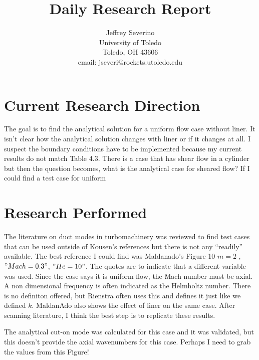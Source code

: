 \documentclass[a4paper]{article}
\begin{document}
\begin{titlepage}

    \title{
    Daily Research Report}

    \author{ Jeffrey Severino \\
        University of Toledo \\
        Toledo, OH  43606 \\
    email: jseveri@rockets.utoledo.edu}


    \maketitle

\end{titlepage}
\section{Current Research Direction}
The goal is to find the analytical solution for a uniform flow case without
liner. It isn't clear how the analytical solution changes with liner or if
it changes at all. I suspect the boundary conditions have to be implemented because
my current results do not match Table 4.3. There is a case that has shear flow
in a cylinder but then the question becomes, what is the analytical case for sheared
flow? If I could find a test case for uniform 

\section{Research Performed}
The literature on duct modes in turbomachinery was reviewed to find test cases
that can be used outside of Kousen's references but there is not any ``readily''
available. The best reference I could find was Maldanado's Figure 10 $m = 2$
, $"Mach = 0.3"$, $"He = 10"$. The quotes are to indicate that a different variable
was used. Since the case says it is uniform flow, the Mach number must be axial.
A non dimensional frequency is often indicated as the Helmholtz number. There is
no definiton offered, but Rienstra often uses this and defines it just like we 
defined $k$. MaldanAdo also shows the effect of liner on the same case. After
scanning literature, I think the best step is to replicate these results.

The analytical cut-on mode was calculated for this case and it was validated, 
but this doesn't provide the axial wavenumbers for this case. Perhaps I need to 
grab the values from this Figure!
\end{document}
